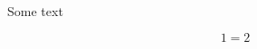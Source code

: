 \documentclass{article}
\begin{document}
Some text

%
%

\begin{equation}
  1=2
\end{equation}
\end{document}
